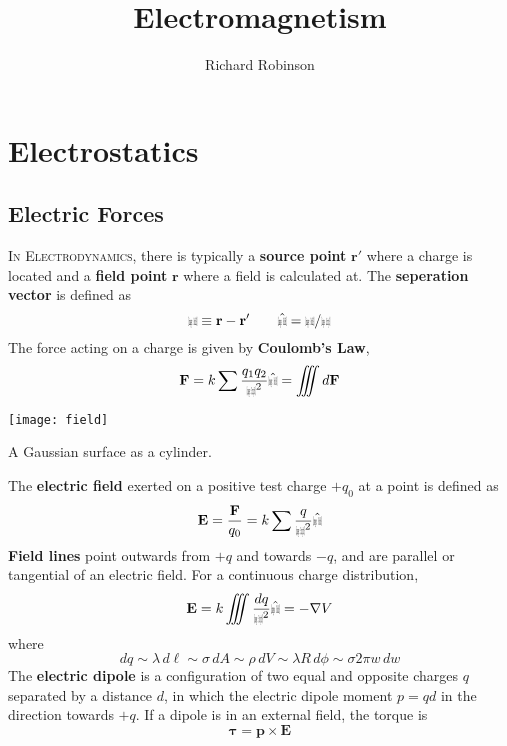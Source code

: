 \documentclass{tufte-book}
\title{Electromagnetism}
\author{Richard Robinson}
\renewcommand{\b}{\mathbf}
\def\r{{\mbox{$\resizebox{.09in}{.08in}{\texttt{[image: ScriptR]}}$}}}
\def\br{{\mbox{$\resizebox{.09in}{.08in}{\texttt{[image: BoldR]}}$}}}
\begin{document}
\frontmatter
\maketitle
\tableofcontents
\mainmatter

\setlength{\parindent}{0pt}


\chapter{Electrostatics}

\section{Electric Forces}
\textsc{In Electrodynamics}, there is typically a \textbf{source point} $\b r '$ where a charge is located and a \textbf{field point} $\b r$ where a field is calculated at. The \textbf{seperation vector} is defined as
\begin{equation}
  \br \equiv \b r - \b r ' \qquad \hat\br = \br/\r
\end{equation}
The force acting on a charge is given by \textbf{Coulomb's Law}, \begin{equation}
  \b F = k \sum \frac{q_1q_2}{\r^2} \hat\br = \iiint d \b F
\end{equation}
%
\begin{marginfigure}
  \texttt{[image: field]}
  \caption{A Gaussian surface as a cylinder.}
\end{marginfigure}
%
The \textbf{electric field} exerted on a positive test charge $+q_0$ at a point is defined as \begin{equation}
  \b E = \frac{\b F}{q_0} = k \sum \frac{q}{\r^2} \hat\br
\end{equation}
\textbf{Field lines} point outwards from $+q$ and towards $-q$, and are parallel or tangential of an electric field. For a continuous charge distribution, \begin{equation}
  \b E = k \iiint \frac{dq}{\r^2} \hat\br = - \nabla V
\end{equation}
where \begin{equation}
  dq \sim \lambda \, d \ell \sim \sigma \, d A \sim \rho \, dV \sim \lambda R \, d \phi \sim \sigma 2 \pi w \, d w
\end{equation}
The \textbf{electric dipole} is a configuration of two equal and opposite charges $q$ separated by a distance $d$, in which the electric dipole moment $p = qd$ in the direction towards $+q$. If a dipole is in an external field, the torque is \begin{equation}
  \b \tau = \b p \times \b E
\end{equation}
\end{document}
